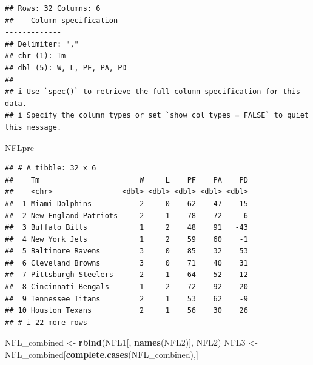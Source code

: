 \documentclass[
]{article}
\newenvironment{Shaded}{\begin{snugshade}}{\end{snugshade}}
\newcommand{\DecValTok}[1]{\textcolor[rgb]{0.00,0.00,0.81}{#1}}
\newcommand{\FunctionTok}[1]{\textcolor[rgb]{0.13,0.29,0.53}{\textbf{#1}}}
\newcommand{\NormalTok}[1]{#1}
\newcommand{\OtherTok}[1]{\textcolor[rgb]{0.56,0.35,0.01}{#1}}
\newcommand{\SpecialCharTok}[1]{\textcolor[rgb]{0.81,0.36,0.00}{\textbf{#1}}}
\begin{document}
\begin{verbatim}
## Rows: 32 Columns: 6
## -- Column specification --------------------------------------------------------
## Delimiter: ","
## chr (1): Tm
## dbl (5): W, L, PF, PA, PD
## 
## i Use `spec()` to retrieve the full column specification for this data.
## i Specify the column types or set `show_col_types = FALSE` to quiet this message.
\end{verbatim}

\begin{Shaded}
\begin{Highlighting}[]
\NormalTok{NFLpre}
\end{Highlighting}
\end{Shaded}

\begin{verbatim}
## # A tibble: 32 x 6
##    Tm                       W     L    PF    PA    PD
##    <chr>                <dbl> <dbl> <dbl> <dbl> <dbl>
##  1 Miami Dolphins           2     0    62    47    15
##  2 New England Patriots     2     1    78    72     6
##  3 Buffalo Bills            1     2    48    91   -43
##  4 New York Jets            1     2    59    60    -1
##  5 Baltimore Ravens         3     0    85    32    53
##  6 Cleveland Browns         3     0    71    40    31
##  7 Pittsburgh Steelers      2     1    64    52    12
##  8 Cincinnati Bengals       1     2    72    92   -20
##  9 Tennessee Titans         2     1    53    62    -9
## 10 Houston Texans           2     1    56    30    26
## # i 22 more rows
\end{verbatim}

\begin{Shaded}
\begin{Highlighting}[]
\NormalTok{NFL\_combined }\OtherTok{\textless{}{-}} \FunctionTok{rbind}\NormalTok{(NFL1[, }\FunctionTok{names}\NormalTok{(NFL2)], NFL2)}
\NormalTok{NFL3 }\OtherTok{\textless{}{-}}\NormalTok{ NFL\_combined[}\FunctionTok{complete.cases}\NormalTok{(NFL\_combined),]}
\end{Highlighting}
\end{Shaded}

\begin{Shaded}
\end{Shaded}
\end{document}
